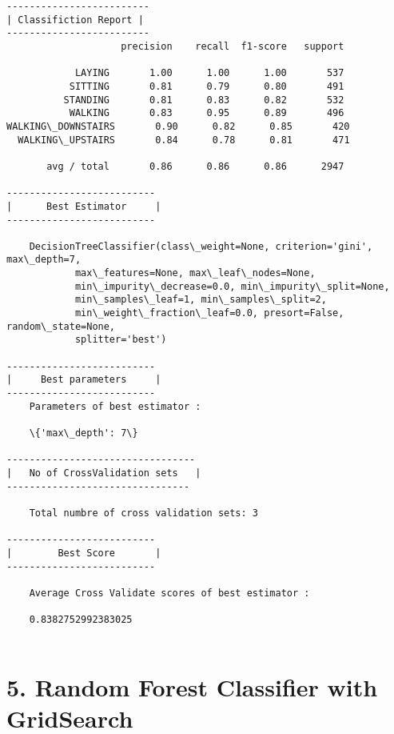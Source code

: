 \documentclass[11pt]{article}
\begin{document}
    \begin{Verbatim}[commandchars=\\\{\}]
-------------------------
| Classifiction Report |
-------------------------
                    precision    recall  f1-score   support

            LAYING       1.00      1.00      1.00       537
           SITTING       0.81      0.79      0.80       491
          STANDING       0.81      0.83      0.82       532
           WALKING       0.83      0.95      0.89       496
WALKING\_DOWNSTAIRS       0.90      0.82      0.85       420
  WALKING\_UPSTAIRS       0.84      0.78      0.81       471

       avg / total       0.86      0.86      0.86      2947

--------------------------
|      Best Estimator     |
--------------------------

	DecisionTreeClassifier(class\_weight=None, criterion='gini', max\_depth=7,
            max\_features=None, max\_leaf\_nodes=None,
            min\_impurity\_decrease=0.0, min\_impurity\_split=None,
            min\_samples\_leaf=1, min\_samples\_split=2,
            min\_weight\_fraction\_leaf=0.0, presort=False, random\_state=None,
            splitter='best')

--------------------------
|     Best parameters     |
--------------------------
	Parameters of best estimator : 

	\{'max\_depth': 7\}

---------------------------------
|   No of CrossValidation sets   |
--------------------------------

	Total numbre of cross validation sets: 3

--------------------------
|        Best Score       |
--------------------------

	Average Cross Validate scores of best estimator : 

	0.8382752992383025


    \end{Verbatim}

    \section{5. Random Forest Classifier with
GridSearch}\label{random-forest-classifier-with-gridsearch}
\end{document}
